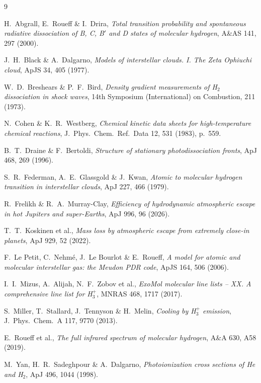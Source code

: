 \documentclass[english,a4paper]{my_memo}
\begin{document}
\begin{thebibliography}{9}

H.~Abgrall, E.~Roueff \& I.~Drira,
\emph{Total transition probability and spontaneous radiative dissociation of
B, C, B$'$ and D states of molecular hydrogen},
A\&AS 141, 297 (2000).

J.~H.~Black \& A.~Dalgarno,
\emph{Models of interstellar clouds. I. The Zeta Ophiuchi cloud},
ApJS 34, 405 (1977).

W.~D.~Breshears \& P.~F.~Bird,
\emph{Density gradient measurements of H$_2$ dissociation in shock waves},
14th Symposium (International) on Combustion, 211 (1973).

N.~Cohen \& K.~R.~Westberg,
\emph{Chemical kinetic data sheets for high-temperature chemical reactions},
J.~Phys.~Chem.~Ref.~Data 12, 531 (1983), p.~559.

B.~T.~Draine \& F.~Bertoldi,
\emph{Structure of stationary photodissociation fronts},
ApJ 468, 269 (1996).

S.~R.~Federman, A.~E.~Glassgold \& J.~Kwan,
\emph{Atomic to molecular hydrogen transition in interstellar clouds},
ApJ 227, 466 (1979).

R.~Frelikh \& R.~A.~Murray-Clay,
\emph{Efficiency of hydrodynamic atmospheric escape in hot Jupiters and
super-Earths},
ApJ 996, 96 (2026).

T.~T.~Koskinen et al.,
\emph{Mass loss by atmospheric escape from extremely close-in planets},
ApJ 929, 52 (2022).

F.~Le Petit, C.~Nehm\'e, J.~Le Bourlot \& E.~Roueff,
\emph{A model for atomic and molecular interstellar gas: the Meudon PDR code},
ApJS 164, 506 (2006).

I.~I.~Mizus, A.~Alijah, N.~F.~Zobov et al.,
\emph{ExoMol molecular line lists -- XX. A comprehensive line list for H$_3^+$},
MNRAS 468, 1717 (2017).

S.~Miller, T.~Stallard, J.~Tennyson \& H.~Melin,
\emph{Cooling by H$_3^+$ emission},
J.~Phys.~Chem.~A 117, 9770 (2013).

E.~Roueff et al.,
\emph{The full infrared spectrum of molecular hydrogen},
A\&A 630, A58 (2019).

M.~Yan, H.~R.~Sadeghpour \& A.~Dalgarno,
\emph{Photoionization cross sections of He and H$_2$},
ApJ 496, 1044 (1998).

\end{thebibliography}
\end{document}
